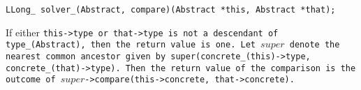 
\tt{LLong_ solver_(Abstract, compare)(Abstract *this, Abstract *that);}


If either \tt{this->type} or \tt{that->type} is not a descendant
of \tt{type_(Abstract)}, then the return value is one.
Let $super$ denote the nearest common ancestor given by
\tt{super(concrete_(this)->type, concrete_(that)->type)}.
Then the return value of the comparison is the outcome of
$super$\tt{->compare(this->concrete, that->concrete)}.
